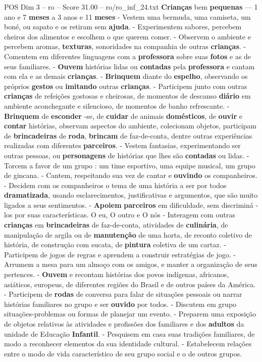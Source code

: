 \begin{textsample}{POS Dim 3 – ro – Score 31.00 – ro/ro\_inf\_24.txt}  \label{ex:f3_pos_132}
\textbf{Crianças} bem \textbf{pequenas} — 1 ano e 7 \textbf{meses} a 3 anos e 11 \textbf{meses} - Vestem uma bermuda, uma camiseta, um boné, ou sapato e os retiram sem \textbf{ajuda}. - Experimentem sabores, percebem cheiros dos alimentos e escolhem o que querem comer. - Observem o ambiente e percebem aromas, \textbf{texturas}, sonoridades na companhia de outras \textbf{crianças}. - Comentem em diferentes linguagens com a \textbf{professora} sobre suas \textbf{fotos} e as de seus familiares. - \textbf{Ouvem} histórias lidas ou \textbf{contadas} pela \textbf{professora} e cantam com ela e as demais \textbf{crianças}. - \textbf{Brinquem} diante do \textbf{espelho}, observando os próprios \textbf{gestos} ou \textbf{imitando} outras \textbf{crianças}. - Participem junto com outras \textbf{crianças} de refeições gostosas e cheirosas, de momentos de descanso \textbf{diário} em ambiente aconchegante e silencioso, de momentos de banho refrescante. - \textbf{Brinquem} de \textbf{esconder} -se, de \textbf{cuidar} de animais \textbf{domésticos}, de \textbf{ouvir} e \textbf{contar} histórias, observam aspectos do ambiente, colecionam objetos, participam de \textbf{brincadeiras} de \textbf{roda}, \textbf{brincam} de faz-de-conta, dentre outras experiências realizadas com diferentes \textbf{parceiros}. - Vestem fantasias, experimentando ser outras pessoas, ou \textbf{personagens} de histórias que lhes são \textbf{contadas} ou lidas. - Torcem a favor de um grupo : um time esportivo, uma equipe musical, um grupo de gincana. - Cantem, respeitando sua vez de cantar e \textbf{ouvindo} os companheiros. - Decidem com os companheiros o tema de uma história a ser por todos \textbf{dramatizada}, usando esclarecimentos, justificativas e argumentos, que são muito ligados a seus sentimentos. - \textbf{Apoiem} \textbf{parceiros} em dificuldade, sem discriminá -los por suas características.
O eu, O outro e O nós - Interagem com outras \textbf{crianças} em \textbf{brincadeiras} de faz-de-conta, atividades de \textbf{culinária}, de manipulação de argila ou de \textbf{manutenção} de uma horta, de reconto coletivo de história, de construção com sucata, de \textbf{pintura} coletiva de um cartaz. - Participem de jogos de regras e aprendem a construir estratégias de jogo. - Arrumem a mesa para um almoço com os amigos, e manter a organização de seus pertences. - \textbf{Ouvem} e recontam histórias dos povos indígenas, africanos, asiáticos, europeus, de diferentes regiões do Brasil e de outros países da América. - Participem de \textbf{rodas} de conversa para falar de situações pessoais ou narrar histórias familiares no grupo e ser \textbf{ouvido} por todos. - Discutem em grupo situações-problemas ou formas de planejar um evento. - Preparem uma exposição de objetos relativos às atividades e profissões dos familiares e dos \textbf{adultos} da unidade de Educação \textbf{Infantil}. - Pesquisem em casa suas tradições familiares, de modo a reconhecer elementos da sua identidade cultural. - Estabelecem relações entre o modo de vida característico de seu grupo social e o de outros grupos.

\end{textsample}
